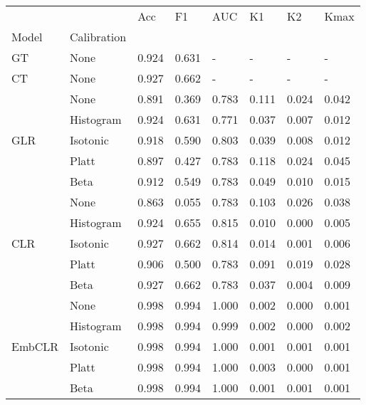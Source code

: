 \begin{tabular}{llllllll}
\toprule
 &  & Acc & F1 & AUC & K1 & K2 & Kmax \\
Model & Calibration &  &  &  &  &  &  \\
\midrule
GT & None & 0.924 & 0.631 & - & - & - & - \\
\cline{1-8}
CT & None & 0.927 & 0.662 & - & - & - & - \\
\cline{1-8}
\multirow[t]{5}{*}{GLR} & None & 0.891 & 0.369 & 0.783 & 0.111 & 0.024 & 0.042 \\
 & Histogram & 0.924 & 0.631 & 0.771 & 0.037 & 0.007 & 0.012 \\
 & Isotonic & 0.918 & 0.590 & 0.803 & 0.039 & 0.008 & 0.012 \\
 & Platt & 0.897 & 0.427 & 0.783 & 0.118 & 0.024 & 0.045 \\
 & Beta & 0.912 & 0.549 & 0.783 & 0.049 & 0.010 & 0.015 \\
\cline{1-8}
\multirow[t]{5}{*}{CLR} & None & 0.863 & 0.055 & 0.783 & 0.103 & 0.026 & 0.038 \\
 & Histogram & 0.924 & 0.655 & 0.815 & 0.010 & 0.000 & 0.005 \\
 & Isotonic & 0.927 & 0.662 & 0.814 & 0.014 & 0.001 & 0.006 \\
 & Platt & 0.906 & 0.500 & 0.783 & 0.091 & 0.019 & 0.028 \\
 & Beta & 0.927 & 0.662 & 0.783 & 0.037 & 0.004 & 0.009 \\
\cline{1-8}
\multirow[t]{5}{*}{EmbCLR} & None & 0.998 & 0.994 & 1.000 & 0.002 & 0.000 & 0.001 \\
 & Histogram & 0.998 & 0.994 & 0.999 & 0.002 & 0.000 & 0.002 \\
 & Isotonic & 0.998 & 0.994 & 1.000 & 0.001 & 0.001 & 0.001 \\
 & Platt & 0.998 & 0.994 & 1.000 & 0.003 & 0.000 & 0.001 \\
 & Beta & 0.998 & 0.994 & 1.000 & 0.001 & 0.001 & 0.001 \\
\cline{1-8}
\bottomrule
\end{tabular}
